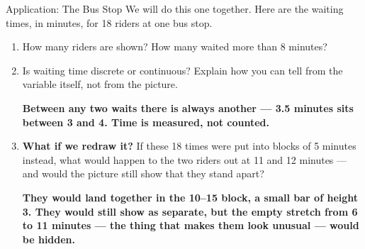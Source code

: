\documentclass[12pt]{article}
\newcommand{\answerspace}[2]{\par\nopagebreak\noindent\begin{minipage}[t][#1][t]{\linewidth}%
  \color{keyred}\bfseries #2\end{minipage}\par}
\begin{document}
\boxguard[14]
\begin{notesbox}{Application: The Bus Stop}
We will do this one together. Here are the waiting times, in minutes, for 18 riders at one bus
stop.

\vspace{3pt}
\begin{center}
\end{center}
\vspace{2pt}

\begin{enumerate}[label=\textbf{\alph*.}, leftmargin=1.8em, itemsep=6pt]
  \item How many riders are shown?  \quad How many waited more than 8 minutes?
  \item Is waiting time discrete or continuous?  \quad Explain how you can tell
        from the variable itself, not from the picture.
        \answerspace{1.6cm}{Between any two waits there is always another --- 3.5 minutes sits
        between 3 and 4. Time is measured, not counted.}
  \item \textbf{What if we redraw it?} If these 18 times were put into blocks of 5 minutes
        instead, what would happen to the two riders out at 11 and 12 minutes --- and would the
        picture still show that they stand apart?
        \answerspace{1.8cm}{They would land together in the 10--15 block, a small bar of height
        3. They would still show as separate, but the empty stretch from 6 to 11 minutes --- the
        thing that makes them look unusual --- would be hidden.}
\end{enumerate}
\end{notesbox}
\end{document}
